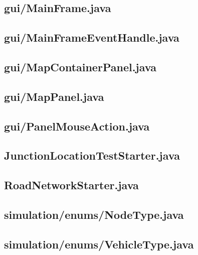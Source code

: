 \subsection{gui/MainFrame.java}

\newpage
\subsection{gui/MainFrameEventHandle.java}

\newpage
\subsection{gui/MapContainerPanel.java}

\newpage
\subsection{gui/MapPanel.java}

\newpage
\subsection{gui/PanelMouseAction.java}

\newpage
\subsection{JunctionLocationTestStarter.java}

\newpage
\subsection{RoadNetworkStarter.java}

\newpage
\subsection{simulation/enums/NodeType.java}

\newpage
\subsection{simulation/enums/VehicleType.java}

\newpage

